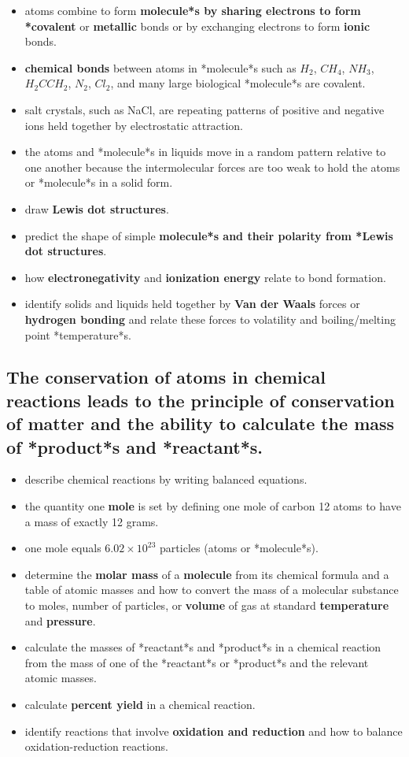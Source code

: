 \documentclass[11pt]{article}
\begin{document}
\begin{itemize}
\item atoms combine to form \textbf{molecule*s by sharing electrons to form *covalent} or \textbf{metallic} bonds or by exchanging electrons to form \textbf{ionic} bonds.
\item \textbf{chemical bonds} between atoms in *molecule*s such as \(H_2\), \(CH_4\), \(NH_3\), \(H_{2}CCH_2\), \(N_2\), \(Cl_2\), and many large biological *molecule*s are covalent.
\item salt crystals, such as NaCl, are repeating patterns of positive and negative ions held together by electrostatic attraction.
\item the atoms and *molecule*s in liquids move in a random pattern relative to one another because the intermolecular forces are too weak to hold the atoms or *molecule*s in a solid form.
\item draw \textbf{Lewis dot structures}.
\item predict the shape of simple \textbf{molecule*s and their polarity from *Lewis dot structures}.
\item how \textbf{electronegativity} and \textbf{ionization \textbf{energy}} relate to bond formation.
\item identify solids and liquids held together by \textbf{Van der Waals} forces or \textbf{hydrogen bonding} and relate these forces to volatility and boiling/melting point *temperature*s.
\end{itemize}
\subsection{The conservation of atoms in chemical reactions leads to the principle of conservation of matter and the ability to calculate the mass of *product*s and *reactant*s.}
\label{sec:org5b495e3}

\begin{itemize}
\item describe chemical reactions by writing balanced equations.
\item the quantity one \textbf{mole} is set by defining one mole of carbon 12 atoms to have a mass of exactly 12 grams.
\item one mole equals \(6.02 \times 10^{23}\) particles (atoms or *molecule*s).
\item determine the \textbf{molar mass} of a \textbf{molecule} from its chemical formula and a table of atomic masses and how to convert the mass of a molecular substance to moles, number of particles, or \textbf{volume} of gas at standard \textbf{temperature} and \textbf{pressure}.
\item calculate the masses of *reactant*s and *product*s in a chemical reaction from the mass of one of the *reactant*s or *product*s and the relevant atomic masses.
\item calculate \textbf{percent yield} in a chemical reaction.
\item identify reactions that involve \textbf{oxidation and reduction} and how to balance oxidation-reduction reactions.
\end{itemize}
\end{document}

